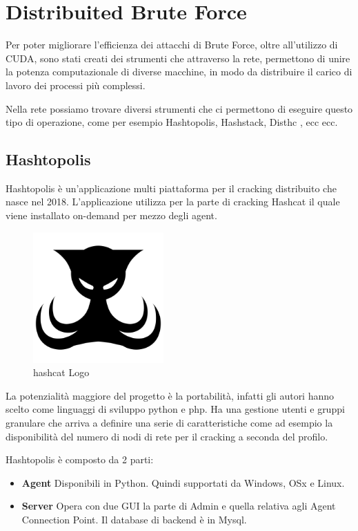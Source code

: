 \chapter{Distribuited Brute Force}

Per poter migliorare l'efficienza dei attacchi di Brute Force, oltre all'utilizzo di CUDA, sono stati creati dei strumenti che attraverso la rete, permettono di unire la potenza computazionale di diverse macchine, in modo da distribuire il carico di lavoro dei processi più complessi.

Nella rete possiamo trovare diversi strumenti che ci permettono di eseguire questo tipo di operazione, come per esempio Hashtopolis, Hashstack, Disthc , ecc ecc.

\section{Hashtopolis}

Hashtopolis \cite{hashtopolis} è un'applicazione multi piattaforma per il cracking distribuito che nasce nel 2018. L’applicazione utilizza per la parte di cracking Hashcat il quale viene installato on-demand per mezzo degli agent. 

\begin{figure}[ht]
    \centering
    \includegraphics[width=50mm]{Immagini/8/hashtopoli_logo.png}
    \caption{hashcat Logo}
\end{figure}

La potenzialità maggiore del progetto è la portabilità, infatti gli autori hanno scelto come linguaggi di sviluppo python e php. Ha una gestione utenti e gruppi granulare che arriva a definire una serie di caratteristiche come ad esempio la disponibilità del numero di nodi di rete per il cracking a seconda del profilo.

Hashtopolis è composto da 2 parti:

\begin{itemize}
    \item \textbf{Agent} Disponibili in Python. Quindi supportati da Windows, OSx e Linux.
    \item \textbf{Server} Opera con due GUI la parte di Admin e quella relativa agli Agent Connection Point. Il database di backend è in Mysql.
\end{itemize}

